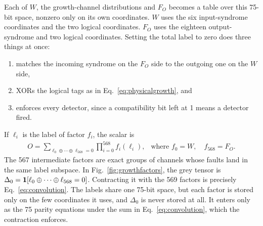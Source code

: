 Each of $W$, the growth-channel distributions and $F_O$ becomes a table over this 75-bit space, nonzero only on its own coordinates. $W$ uses the six input-syndrome coordinates and the two logical coordinates. $F_O$ uses the eighteen output-syndrome and two logical coordinates. 
Setting the total label to zero does three things at once:
\begin{enumerate}
\item matches the incoming syndrome on the $F_O$ side to the outgoing one on the $W$ side, 
\item XORs the logical tags as in Eq.~\eqref{eq:physicalgrowth}, and 
\item enforces every detector, since a compatibility bit left at 1 means a detector fired. 
\end{enumerate}
If $\ell_i$ is the label of factor $f_i$, the scalar is
\begin{equation}
 \begin{gathered}
 O=\sum_{\ell_0\oplus\cdots\oplus\ell_{568}=0}
       \prod_{i=0}^{568}f_i(\ell_i), \ \ \text{ where }
 f_0=W,\quad f_{568}=F_O.
 \end{gathered}
 \label{eq:convolution}
\end{equation}
The 567 intermediate factors are exact groups of channels whose faults land in the same label subspace. 
In Fig.~\ref{fig:growthfactors}, the grey tensor is $\Delta_0=\mathbf1\!\left[\ell_0\oplus\cdots\oplus\ell_{568}=0\right]$. 
Contracting it with the 569 factors is precisely Eq.~\eqref{eq:convolution}. 
The labels share one 75-bit space, but each factor is stored only on the few coordinates it uses, and $\Delta_0$ is never stored at all. 
It enters only as the 75 parity equations under the sum in Eq.~\eqref{eq:convolution}, which the contraction enforces.
{\color{black}
}

